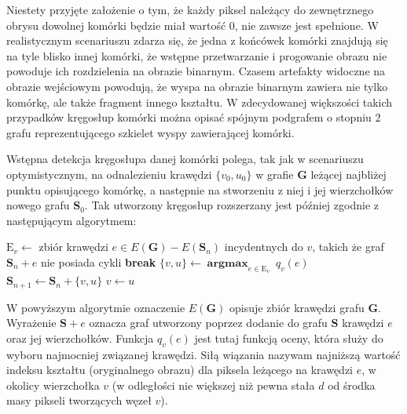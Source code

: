 \documentclass[declaration,shortabstract,mgr]{iithesis}
\DeclareMathOperator*{\argmax}{\textbf{argmax}}
\begin{document}
Niestety przyjęte założenie o tym, że każdy piksel należący do zewnętrznego obrysu dowolnej komórki będzie miał wartość $0$, nie zawsze jest spełnione. W realistycznym scenariuszu zdarza się, że jedna z końcówek komórki znajdują się na tyle blisko innej komórki, że wstępne przetwarzanie i progowanie obrazu nie powoduje ich rozdzielenia na obrazie binarnym. Czasem artefakty widoczne na obrazie wejściowym powodują, że wyspa na obrazie binarnym zawiera nie tylko komórkę, ale także fragment innego kształtu. W zdecydowanej większości takich przypadków kręgosłup komórki można opisać spójnym podgrafem o stopniu 2 grafu reprezentującego szkielet wyspy zawierającej komórki.

Wstępna detekcja kręgosłupa danej komórki polega, tak jak w scenariuszu optymistycznym, na odnalezieniu krawędzi $\{v_0, u_0\}$ w grafie $\mathbf{G}$ leżącej najbliżej punktu opisującego komórkę, a następnie na stworzeniu z niej i jej wierzchołków nowego grafu $\mathbf{S}_0$. Tak utworzony kręgosłup rozszerzany jest później zgodnie z następującym algorytmem:

\begin{algorithm}[H]
\begin{algorithmic}
  \LOOP
    \STATE
      $\text{E}_v \gets$ zbiór krawędzi $e \in E(\mathbf{G}) - E(\mathbf{S}_n)$ incydentnych do $v$,\newline
       takich że graf $\mathbf{S}_n + e$ nie posiada cykli
      \STATE \textbf{break}
    \ENDIF
    \STATE $\{v, u\} \gets \argmax_{e \in \text{E}_v} \ q_v(e)$
    \STATE $\mathbf{S}_{n+1} \gets \mathbf{S}_n + \{v, u\} $
    \STATE $v \gets u$
  \ENDLOOP
\ENDFOR
\end{algorithmic}
\end{algorithm}

\noindent
W powyższym algorytmie oznaczenie $E(\mathbf{G})$ opisuje zbiór krawędzi grafu $\mathbf{G}$.
Wyrażenie $\mathbf{S} + e$ oznacza graf utworzony poprzez dodanie do grafu $\mathbf{S}$ krawędzi $e$ oraz jej wierzchołków.
Funkcja $q_v(e)$ jest tutaj funkcją oceny, która służy do wyboru najmocniej związanej krawędzi. Siłą wiązania nazywam najniższą wartość indeksu kształtu (oryginalnego obrazu) dla piksela leżącego na krawędzi $e$, w okolicy wierzchołka $v$ (w odległości nie większej niż pewna stała $d$ od środka masy pikseli tworzących węzeł $v$).
\end{document}
